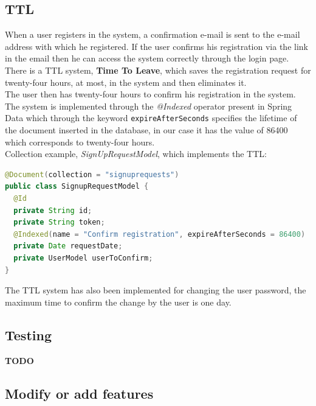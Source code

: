 \subsection{TTL}
When a user registers in the system, a confirmation e-mail is sent to the e-mail address with which he registered. If the user confirms his registration via the link in the email then he can access the system correctly through the login page.\\
There is a TTL system, \textbf{Time To Leave}, which saves the registration request for twenty-four hours, at most, in the system and then eliminates it.\\
The user then has twenty-four hours to confirm his registration in the system.\\
The system is implemented through the \textit{@Indexed} operator present in Spring Data which through the keyword \texttt{expireAfterSeconds} specifies the lifetime of the document inserted in the database, in our case it has the value of 86400 which corresponds to twenty-four hours.\\
Collection example, \textit{SignUpRequestModel}, which implements the TTL: 
\begin{lstlisting}[language=Java]
@Document(collection = "signuprequests")
public class SignupRequestModel {
  @Id
  private String id;
  private String token;
  @Indexed(name = "Confirm registration", expireAfterSeconds = 86400)
  private Date requestDate;
  private UserModel userToConfirm;
}
\end{lstlisting}
The TTL system has also been implemented for changing the user password, the maximum time to confirm the change by the user is one day.



\subsection{Testing}
\begin{huge}
\textbf{TODO}
\end{huge}

\subsection{Modify or add features}
